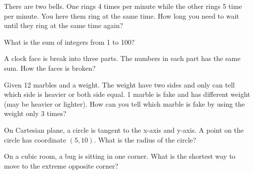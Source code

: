 \begin{exe}
There are two bells. One rings 4 times per minute while the other rings 5 time per minute. You here them ring at the same time. How long you need to wait until they ring at the same time again?
\end{exe}
\begin{teacher}
\begin{sol}
\end{sol}
\end{teacher}

\begin{exe}
What is the sum of integers from 1 to 100?
\end{exe}
\begin{teacher}
\begin{sol}
\end{sol}
\end{teacher}

\begin{exe}
A clock face is break into three parts. The numbers in each part has the same sum. How the faces is broken?
\end{exe}
\begin{teacher}
\begin{sol}
\end{sol}
\end{teacher}

\begin{exe}
Given 12 marbles and a weight. The weight have two sides and only can tell which side is heavier or both side equal. 1 marble is fake and has different weight (may be heavier or lighter). How can you tell which marble is fake by using the weight only 3 times?
\end{exe}
\begin{teacher}
\begin{sol}
\end{sol}
\end{teacher}

\begin{exe}
On Cartesian plane, a circle is tangent to the x-axis and y-axis. A point on the circle has coordinate $(5, 10)$. What is the radius of the circle?
\end{exe}
\begin{teacher}
\begin{sol}
\end{sol}
\end{teacher}

\begin{exe}
On a cubic room, a bug is sitting in one corner. What is the shortest way to move to the extreme opposite corner?
\end{exe}
\begin{teacher}
\begin{sol}
\end{sol}
\end{teacher}

